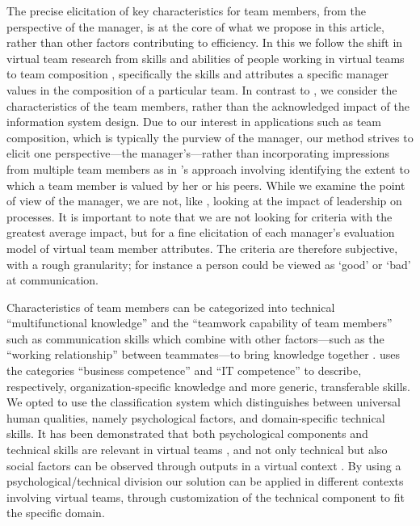 The precise elicitation of key characteristics for team members, from the perspective of the manager, is at the core of what we propose in this article, rather than other factors contributing to efficiency. %
In this we follow the shift in virtual team research from skills and abilities of people working in virtual teams to team composition \citep{Gilsonetal15}, specifically the skills and attributes a specific manager values in the composition of a particular team. 
In contrast to \cite{Kozlowskietal15}, we consider the characteristics of the team members, rather than the acknowledged impact of the information system design. Due to our interest in applications such as team composition, which is typically the purview of the manager, our method strives to elicit one perspective---the manager's---rather than incorporating impressions from multiple team members as in \cite{sarker:2011:role}'s approach involving identifying the extent to which a team member is valued by her or his peers. While we examine the point of view of the manager, we are not, like \cite{Dionneetal04}, looking at the impact of leadership on processes. 
It is important to note that we are not looking for criteria with the greatest average impact, but for a fine elicitation of each manager's evaluation model of virtual team member attributes. 
The criteria are therefore subjective, with a rough granularity; for instance a person could be viewed as `good' or `bad' at communication. 

Characteristics of team members can be categorized into technical ``multifunctional knowledge'' and the ``teamwork capability of team members'' such as communication skills which combine with other factors---such as the ``working relationship'' between teammates---to bring knowledge together \citep{ChenLin04}. \cite{bassellier:2004:business} uses the categories ``business competence'' and ``IT competence'' to describe, respectively, organization-specific knowledge and more generic, transferable skills. We opted to use the classification system which distinguishes between universal human qualities, namely psychological factors, and domain-specific technical skills.
It has been demonstrated that both psychological components and technical skills are
relevant in virtual teams \citep{luse:2013:personality}, and not only technical but also social factors can be observed through outputs in a virtual context \citep{dabbish:2012:social}.
By using a psychological/technical division our solution can be applied in different
contexts involving virtual teams, through customization of the technical component to fit the specific domain.
  
